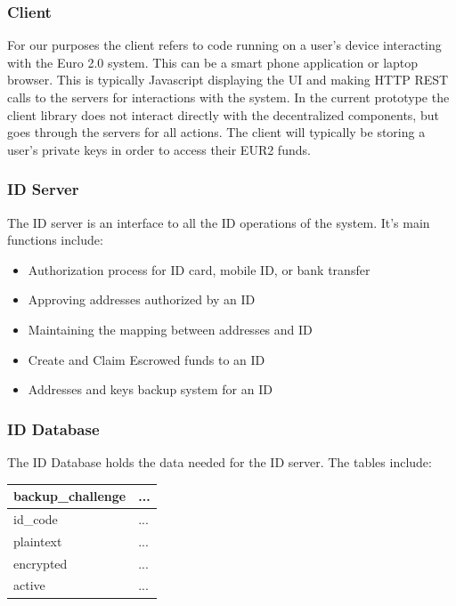 \documentclass[12pt]{article} %
\begin{document}
{\subsubsection{Client} \label{sssec:3.5:client}
For our purposes the client refers to code running on a user's device interacting with the Euro 2.0 system. This can be a smart phone application or laptop browser. This is typically Javascript displaying the UI and making HTTP REST calls to the servers for interactions with the system. In the current prototype the client library does not interact directly with the decentralized components, but goes through the servers for all actions. The client will typically be storing a user's private keys in order to access their EUR2 funds.

\subsubsection{ID Server} \label{sssec:3.5:idServer}
The ID server is an interface to all the ID operations of the system. It's main functions include:

\begin{itemize}
	\item Authorization process for ID card, mobile ID, or bank transfer
	\item Approving addresses authorized by an ID
	\item Maintaining the mapping between addresses and ID
	\item Create and Claim Escrowed funds to an ID
	\item Addresses and keys backup system for an ID
\end{itemize}

\subsubsection{ID Database} \label{sssec:3.5:idDatabase}

The ID Database holds the data needed for the ID server. The tables include:

\begin{center}
\begin{tabular}{ | l | p{10cm} | }
 \hline
 \textbf{backup\_challenge} & ...
 \\ \hline\hline
 id\_code & ...
 \\ \hline
 plaintext & ...
 \\ \hline
 encrypted & ...
 \\ \hline
 active & ...
 \\ \hline
\end{tabular}
\end{center}
\label{tab:idDatabaseBackupChallenge}

}
\end{document}
